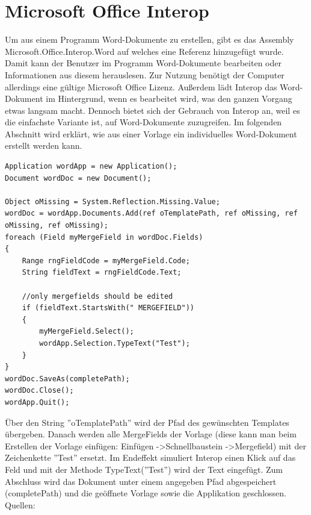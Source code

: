 \section{Microsoft Office Interop}
Um aus einem Programm Word-Dokumente zu erstellen, gibt es das Assembly Microsoft.Office.Interop.Word auf welches eine Referenz hinzugefügt wurde. Damit kann der Benutzer im Programm Word-Dokumente bearbeiten oder Informationen aus diesem herauslesen. Zur Nutzung benötigt der Computer allerdings eine gültige Microsoft Office Lizenz.  Außerdem lädt Interop das Word-Dokument im Hintergrund, wenn es bearbeitet wird, was den ganzen Vorgang etwas langsam macht.
Dennoch bietet sich der Gebrauch von Interop an, weil es die einfachste Variante ist, auf Word-Dokumente zuzugreifen.
Im folgenden Abschnitt wird erklärt, wie aus einer Vorlage ein individuelles Word-Dokument erstellt werden kann.
\begin{lstlisting}
Application wordApp = new Application();
Document wordDoc = new Document();

Object oMissing = System.Reflection.Missing.Value;
wordDoc = wordApp.Documents.Add(ref oTemplatePath, ref oMissing, ref oMissing, ref oMissing);
foreach (Field myMergeField in wordDoc.Fields)
{
	Range rngFieldCode = myMergeField.Code;
	String fieldText = rngFieldCode.Text;

	//only mergefields should be edited
	if (fieldText.StartsWith(" MERGEFIELD"))
	{
		myMergeField.Select();
		wordApp.Selection.TypeText("Test");
	}
}
wordDoc.SaveAs(completePath);
wordDoc.Close();
wordApp.Quit();
\end{lstlisting}
Über den String ''oTemplatePath'' wird der Pfad des gewünschten Templates übergeben. Danach werden alle MergeFields der Vorlage (diese kann man beim Erstellen der Vorlage einfügen: Einfügen -\textgreater Schnellbaustein -\textgreater Mergefield) mit der Zeichenkette ''Test'' ersetzt. Im Endeffekt simuliert Interop einen Klick auf das Feld und mit der Methode TypeText(''Test'') wird der Text eingefügt. Zum Abschluss wird das Dokument unter einem angegeben Pfad abgespeichert (completePath) und die geöffnete Vorlage sowie die Applikation geschlossen. \newline
Quellen: \cite{gembox_microsoft_2018}
